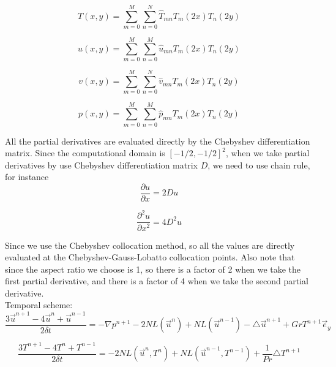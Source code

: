 \documentclass[12pt]{article}
\begin{document}
\begin{equation}
T(x,y) =
  \sum_{m=0}^{M}\sum_{n=0}^{N}\hat{T}_{mn}T_{m}(2x)T_{n}(2y)
\end{equation}

\begin{equation}
u(x,y) = 
  \sum_{m=0}^{M}\sum_{n=0}^{M}\hat{u}_{mn}T_{m}(2x)T_{n}(2y)
\end{equation}

\begin{equation}
v(x,y) = 
  \sum_{m=0}^{M}\sum_{n=0}^{N}\hat{v}_{mn}T_{m}(2x)T_{n}(2y)
\end{equation}

\begin{equation}
p(x,y) = 
  \sum_{m=0}^{M}\sum_{n=0}^{M}\hat{p}_{mn}T_{m}(2x)T_{n}(2y)
\end{equation}

All the partial derivatives are evaluated directly by the Chebyshev differentiation matrix. 
Since the computational domain is $[-1/2,-1/2]^{2}$, when we take partial derivatives 
by use Chebyshev differentiation matrix $D$, we need to use chain rule, for instance
\begin{equation}
\frac{\partial u}{\partial x} = 2Du
\end{equation}

\begin{equation}
\frac{\partial^{2} u}{\partial x^{2}} = 4D^{2}u
\end{equation}

Since we use the Chebyshev collocation method, so all the values are directly 
evaluated at the Chebyshev-Gauss-Lobatto collocation points. Also note that since 
the aspect ratio we choose is 1, so there is a factor of 2 when we take the first 
partial derivative, and there is a factor of 4 when we take the second partial derivative.\\

Temporal scheme:\\
\begin{equation}
\frac{3\vec{u}^{n+1} - 4\vec{u}^{n} + \vec{u}^{n-1}}{2\delta t} =
- \nabla p^{n+1} - 2NL(\vec{u}^{n})
+ NL(\vec{u}^{n-1}) - \triangle \vec{u}^{n+1} + GrT^{n+1}\vec{e}_{y} 
\end{equation}

\begin{equation}
\frac{3T^{n+1} - 4T^{n}+T^{n-1}}{2\delta t} =
- 2NL(\vec{u}^{n},T^{n})
+  NL(\vec{u}^{n-1},T^{n-1}) + \frac{1}{Pr} \triangle T^{n+1}
\end{equation}
\end{document}

